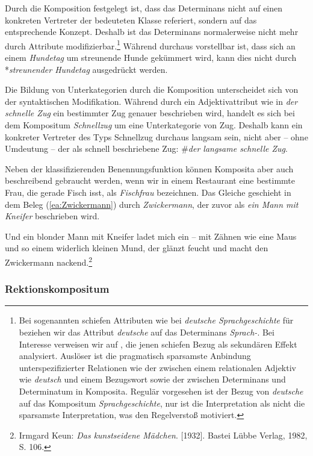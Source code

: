 Durch die Komposition festgelegt ist, dass das Determinans nicht auf einen konkreten Vertreter der bedeuteten Klasse referiert, sondern auf das entsprechende Konzept. Deshalb ist das Determinans normalerweise nicht mehr durch Attribute modifizierbar.\footnote{Bei sogenannten schiefen Attributen wie bei \textit{deutsche Sprachgeschichte} für  beziehen wir das Attribut \textit{deutsche} auf das Determinans \textit{Sprach-}. Bei Interesse verweisen wir auf \citet[178]{Maienborn2020}, die jenen schiefen Bezug als sekundären Effekt analysiert. Auslöser ist die pragmatisch sparsamste Anbindung unterspezifizierter Relationen wie der zwischen einem relationalen Adjektiv wie \textit{deutsch} und einem Bezugswort sowie der zwischen Determinans und Determinatum in Komposita. Regulär vorgesehen ist der Bezug von \textit{deutsche} auf das Kompositum \textit{Sprachgeschichte}, nur ist die Interpretation als  nicht die sparsamste Interpretation, was den Regelverstoß motiviert.} Während durchaus vorstellbar ist, dass sich an einem \textit{Hundetag} um streunende Hunde gekümmert wird, kann dies nicht durch *\textit{streunender Hundetag} ausgedrückt werden.

Die Bildung von Unterkategorien durch die Komposition unterscheidet sich von der syntaktischen Modifikation. Während durch ein Adjektivattribut wie in \textit{der schnelle Zug} ein bestimmter Zug genauer beschrieben wird, handelt es sich bei dem Kompositum \textit{Schnellzug} um eine Unterkategorie von Zug. Deshalb kann ein konkreter Vertreter des Typs Schnellzug durchaus langsam sein, nicht aber -- ohne Umdeutung -- der als schnell beschriebene Zug: \#\textit{der langsame schnelle Zug}.

Neben der klassifizierenden Benennungsfunktion können Komposita aber auch beschreibend gebraucht werden, \zB wenn wir in einem Restaurant eine bestimmte Frau, die gerade Fisch isst, als \textit{Fischfrau} bezeichnen. Das Gleiche geschieht in dem Beleg (\ref{ea:Zwickermann}) durch \textit{Zwickermann}, der zuvor als \textit{ein Mann mit Kneifer} beschrieben wird.

\ea \label{ea:Zwickermann} Und ein blonder Mann mit Kneifer ladet mich ein -- mit Zähnen wie eine Maus und so einem widerlich kleinen Mund, der glänzt feucht und macht den Zwickermann nackend.\footnote{Irmgard Keun: \textit{Das kunstseidene Mädchen}. [1932]. Bastei Lübbe Verlag, 1982, S. 106.}
\z 


\subsubsection{Rektionskompositum}\label{subsubsection:RektKomp}

